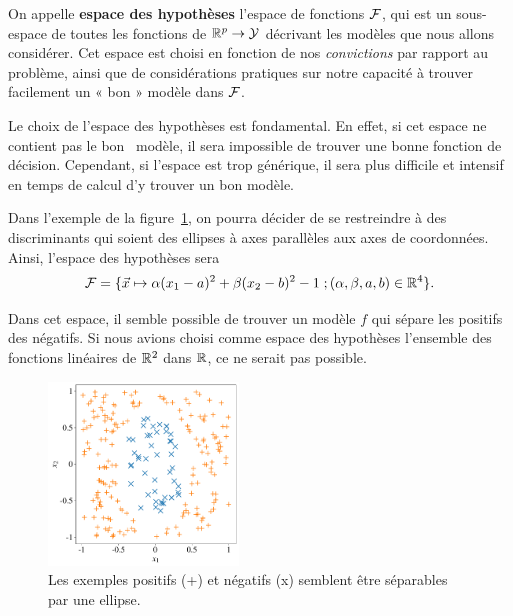 On appelle \textbf{espace des hypothèses} l'espace de fonctions $\mathcal{F}$, qui est
un sous-espace de toutes les fonctions de $\mathbb{R}^p \to \mathcal{Y}$ décrivant les
modèles que nous allons considérer. Cet espace est choisi en
fonction de nos {\it convictions} par rapport au problème, ainsi que de
considérations pratiques sur notre capacité à trouver facilement un « bon »
modèle dans $\mathcal{F}$.

Le choix de l'espace des hypothèses est fondamental.  En effet, si cet espace
ne contient pas le \og bon \fg~modèle, il sera impossible de trouver une bonne
fonction de décision.  Cependant, si l'espace est trop générique, il sera plus
difficile et intensif en temps de calcul d'y trouver un bon modèle.
  

\begin{exemple}
  Dans l'exemple de la figure~\ref{fig:simple_classif_pb}, on pourra décider de
  se restreindre à des discriminants qui soient des ellipses à axes parallèles
  aux axes de coordonnées.  Ainsi, l'espace des hypothèses sera
  \begin{equation}
    \FF = \{ \xx \mapsto \alpha (x_1-a)^2 + \beta (x_2-b)^2 - 1 \; ; (\alpha, \beta, a, b) \in \RR^4\}.
    \label{eq:hypothesis_space_ellipsis}
  \end{equation}

  Dans cet espace, il semble possible de trouver un modèle $f$ qui sépare les
  positifs des négatifs. Si nous avions choisi comme espace des hypothèses
  l'ensemble des fonctions linéaires de $\mathbb{R}^2$ dans $\mathbb{R}$, ce ne serait pas
  possible.
\end{exemple}
\begin{figure}[h]
  \centering
  \includegraphics[width=0.45\textwidth]{figures/erm/simple_classif}
  \caption{Les exemples positifs (+) et négatifs (x) semblent être séparables
    par une ellipse.}
  \label{fig:simple_classif_pb}
\end{figure}

